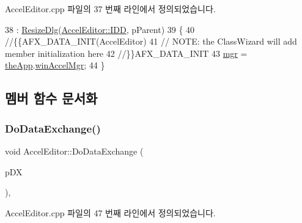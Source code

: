 Accel\+Editor.\+cpp 파일의 37 번째 라인에서 정의되었습니다.


\begin{DoxyCode}
38   : \mbox{\hyperlink{class_resize_dlg_a87bab778e9312f274ebe750d4c3a67ee}{ResizeDlg}}(\mbox{\hyperlink{class_accel_editor_a2c120196c6edcc4e45a1eb6321060cf7a3ed38c6627e19d20129d5a6eee67408c}{AccelEditor::IDD}}, pParent)
39 \{
40   \textcolor{comment}{//\{\{AFX\_DATA\_INIT(AccelEditor)}
41   \textcolor{comment}{// NOTE: the ClassWizard will add member initialization here}
42   \textcolor{comment}{//\}\}AFX\_DATA\_INIT}
43   \mbox{\hyperlink{class_accel_editor_acb731e2193cb5022a95e83122651f96d}{mgr}} = \mbox{\hyperlink{_v_b_a_8cpp_a8095a9d06b37a7efe3723f3218ad8fb3}{theApp}}.\mbox{\hyperlink{class_v_b_a_ad7ebce057dbde0ca88cee75e84721a89}{winAccelMgr}};
44 \}
\end{DoxyCode}


\subsection{멤버 함수 문서화}
\mbox{\label{class_accel_editor_a3212b434e8c489ba308fa6a474dd32e7}} 
\subsubsection{\texorpdfstring{Do\+Data\+Exchange()}{DoDataExchange()}}
{\footnotesize\ttfamily void Accel\+Editor\+::\+Do\+Data\+Exchange (\begin{DoxyParamCaption}\item[{C\+Data\+Exchange $\ast$}]{p\+DX }\end{DoxyParamCaption})\hspace{0.3cm}{\ttfamily [protected]}, {\ttfamily [virtual]}}



Accel\+Editor.\+cpp 파일의 47 번째 라인에서 정의되었습니다.


